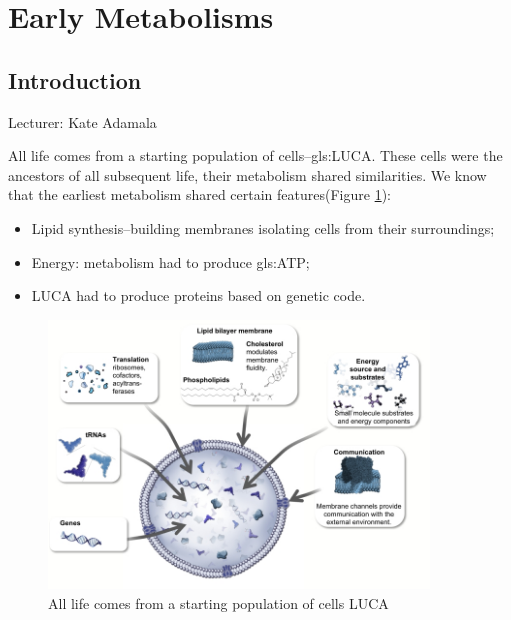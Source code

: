 \documentclass[]{article}
\begin{document}
\section{Early Metabolisms}

\subsection{Introduction}

Lecturer: Kate Adamala

All life comes from a starting population of cells--\gls{gls:LUCA}. These cells were the ancestors of all subsequent life, their metabolism shared similarities. We know that the earliest metabolism shared certain features(Figure \ref {fig:LUCA_cell}):
\begin{itemize}
	\item Lipid synthesis--building membranes isolating cells from their surroundings;
	\item Energy: metabolism had to produce \gls{gls:ATP};
	\item LUCA had to produce proteins based on genetic code.
\end{itemize}
\begin{figure}[H]
	\caption{All life comes from a starting population of cells LUCA} \label{fig:LUCA_cell} 
	\includegraphics[width=0.9\textwidth]{LUCA_cell}
\end{figure}
\end{document}
